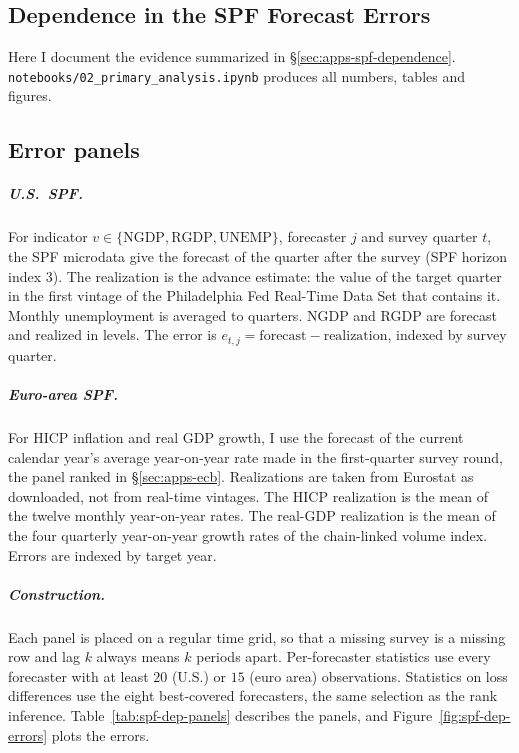 \begin{appendix}
\tabAppMThreeRobust

\chapter{Dependence in the SPF Forecast Errors}
\label{app:spf-dependence}

Here I document the evidence summarized in \S\ref{sec:apps-spf-dependence}.
\texttt{notebooks/02\_primary\_analysis.ipynb} produces all numbers, tables and figures.

\section{Error panels}
\label{app:spf-dep-panels}

\paragraph{U.S.\ SPF.} For indicator $v\in\{\text{NGDP},\text{RGDP},\text{UNEMP}\}$,
forecaster $j$ and survey quarter $t$, the SPF microdata give the forecast of the quarter
after the survey (SPF horizon index $3$). The realization is the advance estimate: the
value of the target quarter in the first vintage of the Philadelphia Fed Real-Time Data
Set that contains it. Monthly unemployment is averaged to quarters. NGDP and RGDP are
forecast and realized in levels. The error is $e_{t,j}=\text{forecast}-\text{realization}$,
indexed by survey quarter.

\paragraph{Euro-area SPF.} For HICP inflation and real GDP growth, I use the forecast of
the current calendar year's average year-on-year rate made in the first-quarter survey
round, the panel ranked in \S\ref{sec:apps-ecb}. Realizations are taken from
Eurostat as downloaded, not from real-time vintages. The HICP realization is the mean of
the twelve monthly year-on-year rates. The real-GDP realization is the mean of the four
quarterly year-on-year growth rates of the chain-linked volume index. Errors are indexed
by target year.

\paragraph{Construction.} Each panel is placed on a regular time grid, so that a missing
survey is a missing row and lag $k$ always means $k$ periods apart. Per-forecaster
statistics use every forecaster with at least $20$ (U.S.) or $15$ (euro area)
observations. Statistics on loss differences use the eight best-covered forecasters, the
same selection as the rank inference. Table~\ref{tab:spf-dep-panels} describes the panels,
and Figure~\ref{fig:spf-dep-errors} plots the errors.


\end{appendix}
